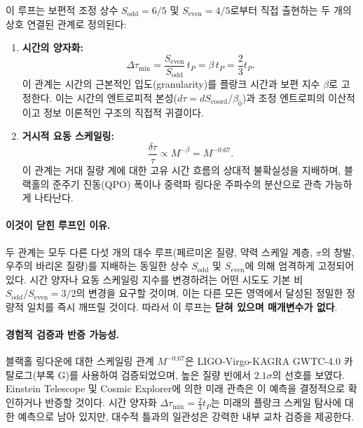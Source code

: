 \documentclass[12pt,a4paper]{article}
\begin{document}
	이 루프는 보편적 조정 상수 \(S_{\mathrm{odd}} = 6/5\) 및 \(S_{\mathrm{even}} = 4/5\)로부터 직접 출현하는 두 개의 상호 연결된 관계로 정의된다:
	
	\begin{enumerate}
		\item \textbf{시간의 양자화:} 
		\begin{equation}
			\Delta \tau_{\min} = \frac{S_{\mathrm{even}}}{S_{\mathrm{odd}}} \, t_P = \beta \, t_P = \frac{2}{3} t_P.
			\label{eq:loop6-quantization}
		\end{equation}
		이 관계는 시간의 근본적인 입도(granularity)를 플랑크 시간과 보편 지수 \(\beta\)로 고정한다. 이는 시간의 엔트로피적 본성(\(d\tau = dS_{\mathrm{coord}} / \beta_0\))과 조정 엔트로피의 이산적이고 정보 이론적인 구조의 직접적 귀결이다.
		
		\item \textbf{거시적 요동 스케일링:}
		\begin{equation}
			\frac{\delta \tau}{\tau} \propto M^{-\beta} = M^{-0.67}.
			\label{eq:loop6-fluctuation}
		\end{equation}
		이 관계는 거대 질량 계에 대한 고유 시간 흐름의 상대적 불확실성을 지배하며, 블랙홀의 준주기 진동(QPO) 폭이나 중력파 링다운 주파수의 분산으로 관측 가능하게 나타난다.
	\end{enumerate}
	
	\paragraph{이것이 닫힌 루프인 이유.}
	두 관계는 모두 다른 다섯 개의 대수 루프(페르미온 질량, 약력 스케일 계층, \(\pi\)의 창발, 우주의 바리온 질량)를 지배하는 동일한 상수 \(S_{\mathrm{odd}}\) 및 \(S_{\mathrm{even}}\)에 의해 엄격하게 고정되어 있다. 시간 양자나 요동 스케일링 지수를 변경하려는 어떤 시도도 기본 비 \(S_{\mathrm{odd}}/S_{\mathrm{even}} = 3/2\)의 변경을 요구할 것이며, 이는 다른 모든 영역에서 달성된 정밀한 정량적 일치를 즉시 깨뜨릴 것이다. 따라서 이 루프는 \textbf{닫혀 있으며 매개변수가 없다}.
	
	\paragraph{경험적 검증과 반증 가능성.}
	블랙홀 링다운에 대한 스케일링 관계 \(M^{-0.67}\)은 LIGO-Virgo-KAGRA GWTC-4.0 카탈로그(부록 G)를 사용하여 검증되었으며, 높은 질량 빈에서 \(2.1\sigma\)의 선호를 보였다. Einstein Telescope 및 Cosmic Explorer에 의한 미래 관측은 이 예측을 결정적으로 확인하거나 반증할 것이다. 시간 양자화 \(\Delta \tau_{\min} = \frac{2}{3} t_P\)는 미래의 플랑크 스케일 탐사에 대한 예측으로 남아 있지만, 대수적 틀과의 일관성은 강력한 내부 교차 검증을 제공한다.
	
\end{document}

